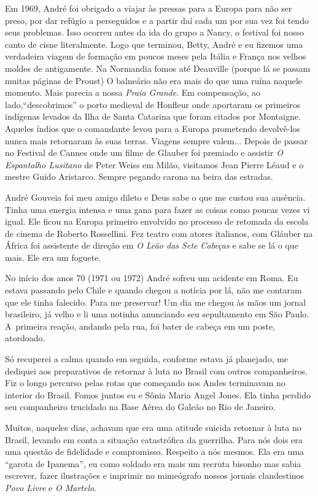Em 1969, André foi obrigado a viajar às pressas para a Europa para não
ser preso, por dar refúgio a perseguidos e a partir daí cada um por sua
vez foi tendo seus problemas. Isso ocorreu antes da ida do grupo a
Nancy, o festival foi nosso canto de cisne literalmente. Logo que
terminou, Betty, André e eu fizemos uma verdadeira viagem de formação em
poucos meses pela Itália e França nos velhos moldes de antigamente. Na
Normandia fomos até Deauville (porque lá se passam muitas páginas de
Proust) O balneário não era mais do que uma ruína naquele momento. Mais
parecia a nossa {\it Praia Grande}. Em compensação, ao
lado,“descobrimos” o porto medieval de Honfleur onde aportaram os
primeiros indígenas levados da Ilha de Santa Catarina que foram citados
por Montaigne. Aqueles índios que o comandante levou para a Europa
prometendo devolvê-los nunca mais retornaram às suas terras. Viagens
sempre valem... Depois de passar no Festival de Cannes onde um filme de
Glauber foi premiado e assistir {\it O Espantalho Lusitano} de Peter
Weiss em Milão, visitamos Jean Pierre Léaud e o mestre Guido Aristarco.
Sempre pegando carona na beira das estradas.

André Gouveia foi meu amigo dileto e Deus sabe o que me custou sua
ausência. Tinha uma energia intensa e uma gana para fazer as coisas como
poucas vezes vi igual. Ele ficou na Europa primeiro envolvido no
processo de retomada da escola de cinema de Roberto Rossellini. Fez
teatro com atores italianos, com Gláuber na África foi assistente de
direção em {\it O Leão das Sete Cabeças} e sabe se lá o que mais. Ele
era um foguete.

No início dos anos 70 (1971 ou 1972) André sofreu um acidente em Roma.
Eu estava passando pelo Chile e quando chegou a notícia por lá, não me
contaram que ele tinha falecido. Para me preservar! Um dia me chegou às
mãos um jornal brasileiro, já velho e li uma notinha anunciando seu
sepultamento em São Paulo. A~primeira reação, andando pela rua, foi
bater de cabeça em um poste, atordoado.

Só recuperei a calma quando em seguida, conforme estava já planejado, me
dediquei aos preparativos de retornar à luta no Brasil com outros
companheiros. Fiz o longo percurso pelas rotas que começando nos Andes
terminavam no interior do Brasil. Fomos juntos eu e Sônia Maria Angel
Jones. Ela tinha perdido seu companheiro trucidado na Base Aérea do
Galeão no Rio de Janeiro.

Muitos, naqueles dias, achavam que era uma atitude suicida retornar à
luta no Brasil, levando em conta a situação catastrófica da guerrilha.
Para nós dois era uma questão de fidelidade e compromisso. Respeito a
nós mesmos. Ela era uma “garota de Ipanema”, eu como soldado era mais um
recruta bisonho mas sabia escrever, fazer ilustrações e imprimir no
mimeógrafo nossos jornais clandestinos {\it Povo Livre} e {\it O
Martelo}.

